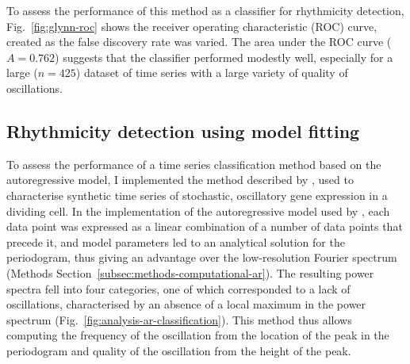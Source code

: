 To assess the performance of this method as a classifier for rhythmicity detection, Fig.\ \ref{fig:glynn-roc} shows the receiver operating characteristic (ROC) curve, created as the false discovery rate was varied.
The area under the ROC curve ($A = 0.762$) suggests that the classifier performed modestly well, especially for a large ($n=425$) dataset of time series with a large variety of quality of oscillations.


\subsection{Rhythmicity detection using model fitting}
\label{subsec:analysis-classification-ar}

To assess the performance of a time series classification method based on the autoregressive model, I implemented the method described by \textcite{jiaFrequencyDomainAnalysis2020}, used to characterise synthetic time series of stochastic, oscillatory gene expression in a dividing cell.
In the implementation of the autoregressive model used by \textcite{jiaFrequencyDomainAnalysis2020}, each data point was expressed as a linear combination of a number of data points that precede it, and model parameters led to an analytical solution for the periodogram, thus giving an advantage over the low-resolution Fourier spectrum (Methods Section~\ref{subsec:methods-computational-ar}).
The resulting power spectra fell into four categories, one of which corresponded to a lack of oscillations, characterised by an absence of a local maximum in the power spectrum (Fig.\ \ref{fig:analysis-ar-classification}).
This method thus allows computing the frequency of the oscillation from the location of the peak in the periodogram and quality of the oscillation from the height of the peak.

